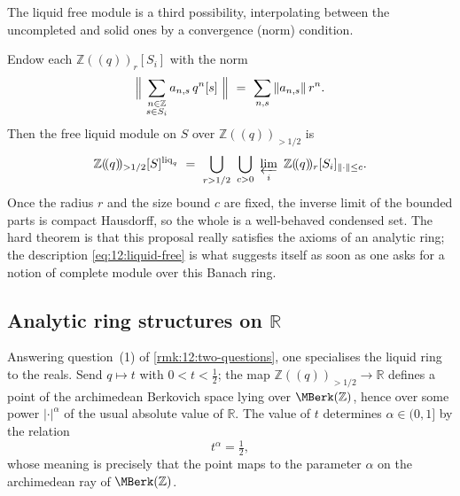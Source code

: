 The liquid free module is a third possibility, interpolating between the
uncompleted and solid ones by a convergence (norm) condition.

\begin{definition}
\label{def:12:liquid-free}
Endow each $\mathbb{Z}(\!(q)\!)_{r}[S_i]$ with the norm
\begin{equation*}
\Bigl\|\ \sum_{\substack{n\in\mathbb{Z}\\ s\in S_i}} a_{n,s}\,q^{n}[s]\ \Bigr\|
\ =\ \sum_{n,s}\|a_{n,s}\|\,r^{n}.
\end{equation*}
Then the free liquid module on $S$ over $\mathbb{Z}(\!(q)\!)_{>1/2}$ is
\begin{equation}
\label{eq:12:liquid-free}
\mathbb{Z}(\!(q)\!)_{>1/2}[S]^{\mathrm{liq}_q}\ =\
\bigcup_{r>1/2}\ \bigcup_{c>0}\ \varprojlim_i\
\mathbb{Z}(\!(q)\!)_{r}[S_i]_{\|\cdot\|\le c}.
\end{equation}
Once the radius $r$ and the size bound $c$ are fixed, the inverse limit of the
bounded parts is compact Hausdorff, so the whole is a well-behaved condensed
set. The hard theorem \cite{clausen2020analytic} is that this proposal really
satisfies the axioms of an analytic ring; the description
\eqref{eq:12:liquid-free} is what suggests itself as soon as one asks for a
notion of complete module over this Banach ring.
\end{definition}

\subsection{Analytic ring structures on \texorpdfstring{$\mathbb{R}$}{R}}

Answering question~(1) of \cref{rmk:12:two-questions}, one specialises the liquid
ring to the reals. Send $q\mapsto t$ with $0<t<\tfrac12$; the map
$\mathbb{Z}(\!(q)\!)_{>1/2}\to\mathbb{R}$ defines a point of the archimedean
Berkovich space lying over $\MBerk(\mathbb{Z})$, hence over some power
$|\cdot|^{\alpha}$ of the usual absolute value of $\mathbb{R}$. The value of $t$
determines $\alpha\in(0,1]$ by the relation
\begin{equation*}
t^{\alpha}=\tfrac12,
\end{equation*}
whose meaning is precisely that the point maps to the parameter $\alpha$ on the
archimedean ray of $\MBerk(\mathbb{Z})$.

